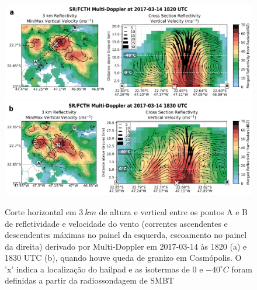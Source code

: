 \begin{figure}[htb]
	\centering
	\caption{Corte horizontal em $3\:km$ de altura e vertical entre os pontos A e B de refletividade e velocidade do vento (correntes ascendentes e descendentes máximas no painel da esquerda, escoamento no painel da direita) derivado por Multi-Doppler em 2017-03-14 às 1820 (a) e 1830 UTC (b), quando houve queda de granizo em Cosmópolis. O 'x' indica a localização do hailpad e as isotermas de $0$ e $-40^{\circ}C$ foram definidas a partir da radiossondagem de SMBT} 
	\label{doppler_20170314_1}
	\vspace{-5pt}
	\includegraphics[width=\columnwidth]{../MultiDoppler_Processing/figures/SR-FCTH 2017-03-14 1820 UTC.png} \\
	\vspace{-5pt}
	\includegraphics[width=\columnwidth]{../MultiDoppler_Processing/figures/SR-FCTH 2017-03-14 1830 UTC.png} \\
\end{figure}


